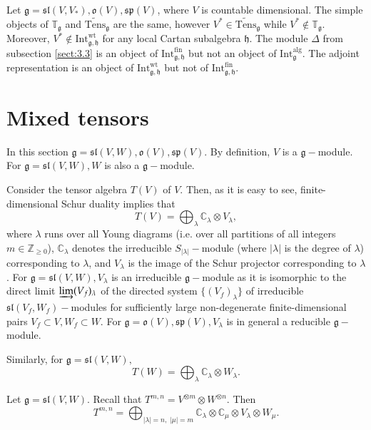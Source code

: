 \documentclass{svmult}
\newcommand {\ZZ} {\mathbb {Z}}
\newcommand {\CC} {\mathbb {C}}
\newcommand{\TT}{\mathbb{T}}
\newcommand{\wt}{\mathrm{wt}}
\renewcommand{\sp}{\mathfrak{sp}}
\renewcommand{\sl}{\mathfrak{sl}}
\newcommand{\oo}{\mathfrak{o}}
\newcommand{\hh}{\mathfrak{h}}
\renewcommand{\gg}{\mathfrak{g}}
\newcommand{\Int}{\mathrm{Int}}
\newcommand{\alg}{\mathrm{alg}}
\newcommand{\fin}{\mathrm{fin}}
\begin{document}
  Let $\gg = \sl(V,V_*), \oo(V), \sp(V)$, where $V$ is countable dimensional. The simple objects of $\TT_\gg$ and $\widetilde{\mathrm{Tens}}_\gg$ are the same, however $V^* \in \widetilde{\mathrm{Tens}}_\gg$ while $V^* \notin \TT_\gg$. Moreover, $V^* \notin \mathrm{Int}^{\wt}_{\gg,\hh}$ for any local Cartan subalgebra $\hh$. The module $\Delta$ from subsection \ref{sect:3.3} is an object of $\mathrm{Int}_{\gg,\hh}^\fin$ but not an object of $\mathrm{Int}_\gg^\alg$.  The adjoint representation is an object of $\mathrm{Int}^{\wt}_{\gg,\hh}$ but not of $\Int_{\gg,\hh}^\fin$.

\section{Mixed tensors}\label{sect:4}
In this section $\gg = \sl(V,W), \oo(V), \sp(V)$. By definition, $V$ is a $\gg-$module. For $\gg = \sl(V,W), W$ is also a $\gg-$module.

Consider the tensor algebra $T(V)$ of $V$. Then, as it is easy to see, finite-dimensional Schur duality implies that
\begin{equation}\label{schur_imp}
 T(V)=\bigoplus_{\lambda}\CC_{\lambda} \otimes V_{\lambda}, 
\end{equation}
where $\lambda$ runs over all Young diagrams (i.e. over all partitions of all integers $m \in \ZZ_{\geq 0}$), $\CC_{\lambda}$ denotes the irreducible $S_{|\lambda|}-$module (where $|\lambda|$ is the degree of $\lambda$) corresponding to $\lambda$, and $V_{\lambda}$ is the image of the Schur projector corresponding to $\lambda$. For $\gg = \sl(V,W), V_{\lambda}$ is an irreducible $\gg-$module as it is isomorphic to the direct limit $\varinjlim(V_f)_{\lambda}$ of the directed system $\{(V_f)_\lambda\}$ of irreducible $\sl(V_f,W_f)-$modules for sufficiently large non-degenerate finite-dimensional pairs $V_f \subset V, W_f \subset W$. For $\gg=\oo(V), \sp(V), V_{\lambda}$ is in general a reducible $\gg-$module.

Similarly, for $\gg = \sl(V,W),$
\begin{equation}\label{schur_imp1}
 T(W)=\bigoplus_{\lambda}\CC_{\lambda} \otimes W_{\lambda}.\nonumber
\end{equation}

Let $\gg = \sl(V,W)$. Recall that $T^{m,n}=V^{\otimes m}\otimes W^{\otimes n}$.
Then
\begin{equation}
 T^{m,n} = \bigoplus_{|\lambda|=n, \; |\mu| = m} \CC_{\lambda} \otimes \CC_{\mu} \otimes V_{\lambda} \otimes W_{\mu}.\nonumber
\end{equation}
\end{document}
